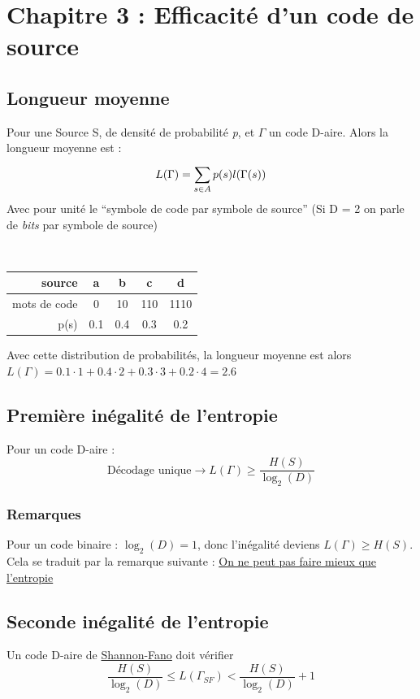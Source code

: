 \documentclass[11pt,a4paper]{article}
\renewcommand{\)}{\right)}
\renewcommand{\(}{\left(}
\begin{document}
\section[Efficacité d'un Code de Source]{Chapitre 3 : Efficacité d'un code de source}
\subsection{Longueur moyenne}
Pour une Source S, de densité de probabilité \textit{p}, et $\Gamma$ un code D-aire. Alors la longueur moyenne est :
\begin{equation}
	L(\Gamma) = \sum\limits_{s\in A}^{}p(s)l(\Gamma(s))
\end{equation}
Avec pour unité le \enquote{symbole de code par symbole de source} (Si D = 2 on parle de \textit{bits} par symbole de source)\\
\begin{exemple}~
	\begin{multicols}{2}
		\begin{tabular}{r|c|c|c|c}
			source & a&b&c&d\\
			\hline
			mots de code & 0 & 10 & 110 & 1110\\
			\hline
			p(s) & 0.1 & 0.4 & 0.3 & 0.2 
		\end{tabular} 
		\columnbreak
			
		Avec cette distribution de probabilités, la longueur moyenne est alors \\$L(\Gamma) = 0.1\cdot 1 + 0.4\cdot 2 + 0.3 \cdot 3 + 0.2 \cdot 4 = 2.6$
	\end{multicols}
\end{exemple}

\subsection{Première inégalité de l'entropie}
\label{premiere inegalite entropie}
Pour un code D-aire :
\begin{equation}
	\text{Décodage unique} \to L(\Gamma)\geq \frac{H(S)}{\log_2(D)}
\end{equation}
\subsubsection{Remarques}
Pour un code binaire : $\log_2(D) = 1$, donc l'inégalité deviens $L(\Gamma) \geq H(S)$. Cela se traduit par la remarque suivante  : \uline{On ne peut pas faire mieux que l'entropie}

\subsection{Seconde inégalité de l'entropie}
\label{seconde inegalite entropie}
Un code D-aire de \hyperref[shannon]{Shannon-Fano} doit vérifier 
\begin{equation}
	\frac{H(S)}{\log_2(D)} \leq L(\Gamma_{SF}) < \frac{H(S)}{\log_2(D)}+1	
\end{equation}
\end{document}
